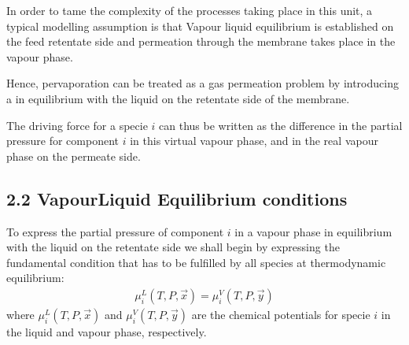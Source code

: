 \documentclass[letterpaper,10pt,english]{jupyterBook}
\begin{document}
\sphinxAtStartPar
In order to tame the complexity of the processes taking place in this unit, a typical modelling assumption is that Vapour liquid equilibrium is established on the feed retentate side and permeation through the membrane takes place in the vapour phase.

\sphinxAtStartPar
Hence, pervaporation can be treated as a gas permeation problem by introducing a  in equilibrium with the liquid on the retentate side of the membrane.

\sphinxAtStartPar
The driving force for a specie \(i\) can thus be written as the difference in the partial pressure for component \(i\) in this virtual vapour phase, and in the real vapour phase on the permeate side.


\subsection{2.2 Vapour\sphinxhyphen{}Liquid Equilibrium conditions}
\label{\detokenize{Pervaporation:vapour-liquid-equilibrium-conditions}}
\sphinxAtStartPar
To express the partial pressure of component \(i\) in a vapour phase in equilibrium with the liquid on the retentate side we shall begin by expressing the fundamental condition that has to be fulfilled by all species at thermodynamic equilibrium:
\begin{equation}\label{equation:Pervaporation:PVAPeq:fund}
\begin{split}
\mu_i^L(T,P,\vec{x})=\mu_i^V(T,P,\vec{y})
\end{split}
\end{equation}
\sphinxAtStartPar
where \(\mu_i^L(T,P,\vec{x})\) and \(\mu_i^V(T,P,\vec{y})\) are the chemical potentials for specie \(i\) in the liquid and vapour phase, respectively.
\end{document}

